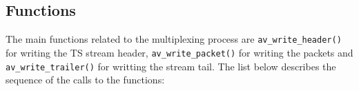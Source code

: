 \documentclass[
	12pt,				%
	openright,			%
	twoside,			%
	a4paper,			%
	brazil,
	french,				%
	english
	]{abntex2}
\begin{document}


\subsection{Functions}

The main functions related to the multiplexing process are \texttt{av\hspace{0.1mm}\hspace{0.1mm}\_\hspace{0.1mm}\hspace{0.1mm}write\hspace{0.1mm}\hspace{0.1mm}\_\hspace{0.1mm}\hspace{0.1mm}header()} for writing the TS stream header, \texttt{av\hspace{0.1mm}\hspace{0.1mm}\_\hspace{0.1mm}\hspace{0.1mm}write\hspace{0.1mm}\hspace{0.1mm}\_\hspace{0.1mm}\hspace{0.1mm}packet()} for writing the packets and \texttt{av\hspace{0.1mm}\hspace{0.1mm}\_\hspace{0.1mm}\hspace{0.1mm}write\hspace{0.1mm}\hspace{0.1mm}\_\hspace{0.1mm}\hspace{0.1mm}trailer()} for writting the stream tail. The list below describes the sequence of the calls to the functions:
\end{document}
